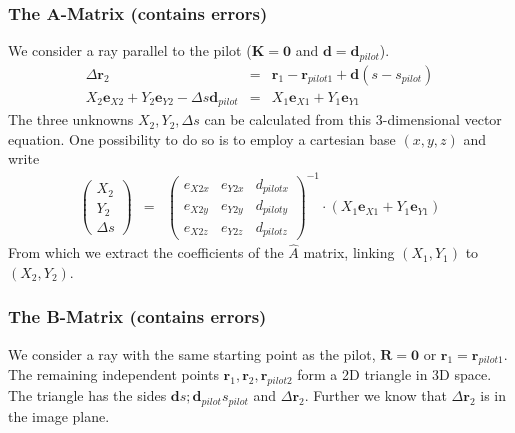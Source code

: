 \documentclass[12pt,a4paper,twoside,openright,BCOR10mm,headsepline,titlepage,abstracton,chapterprefix,final]{scrreprt}
\newcommand\Vector[1]{{\mathbf{#1}}}
\begin{document}
\subsubsection{The A-Matrix (contains errors)}
We consider a ray parallel to the pilot ($\Vector{K} = \Vector{0}$ and $\Vector{d} = \Vector{d}_{pilot}$).
\begin{eqnarray}
 \Delta \Vector{r}_2 &=& \Vector{r}_{1} - \Vector{r}_{pilot1} + \Vector{d} ( s - s_{pilot} ) \\
 X_2 \Vector{e}_{X2} +  Y_2 \Vector{e}_{Y2} - \Delta s \Vector{d}_{pilot} &=&  X_1 \Vector{e}_{X1} +  Y_1 \Vector{e}_{Y1} 
\end{eqnarray}
The three unknowns $X_2 , Y_2, \Delta s$ can be calculated from this 3-dimensional vector equation.
One possibility to do so is to employ a cartesian base $(x,y,z)$ and write
\begin{eqnarray}
 \begin{pmatrix}
  X_2 \\ Y_2 \\ \Delta s
 \end{pmatrix}
 &=&
 \begin{pmatrix}
  e_{X2x} & e_{Y2x} & d_{pilotx} \\
  e_{X2y} & e_{Y2y} & d_{piloty} \\
  e_{X2z} & e_{Y2z} & d_{pilotz}  
 \end{pmatrix}^{-1}
 \cdot
 \left(
 X_1 \Vector{e}_{X1} + Y_1 \Vector{e}_{Y1}
 \right)
\end{eqnarray}
From which we extract the coefficients of the $\hat{A}$ matrix, 
linking $(X_1,Y_1)$ to $(X_2,Y_2)$.

\subsubsection{The B-Matrix (contains errors)}
We consider a ray with the same starting point as the pilot, $\Vector{R} = \Vector{0}$ or $\Vector{r}_{1} = \Vector{r}_{pilot1}$. 
The remaining independent points $\Vector{r}_{1}, \Vector{r}_{2}, \Vector{r}_{pilot2}$ form a 2D triangle in 3D space.
The triangle has the sides $\Vector{d} s ; \Vector{d}_{pilot} s_{pilot}$ and $\Delta \Vector{r}_2$. 
Further we know that $\Delta \Vector{r}_2$ is in the image plane.
\end{document}
